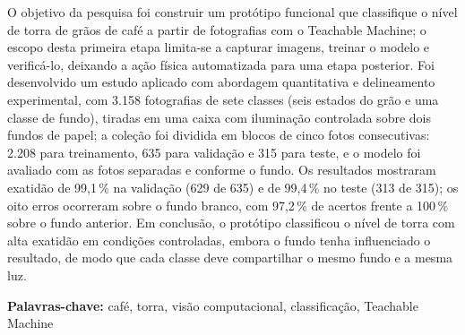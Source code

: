 \begin{absblock}
O objetivo da pesquisa foi construir um protótipo funcional que classifique o nível de torra de grãos de café a partir de fotografias com o Teachable Machine; o escopo desta primeira etapa limita-se a capturar imagens, treinar o modelo e verificá-lo, deixando a ação física automatizada para uma etapa posterior. Foi desenvolvido um estudo aplicado com abordagem quantitativa e delineamento experimental, com 3.158 fotografias de sete classes (seis estados do grão e uma classe de fundo), tiradas em uma caixa com iluminação controlada sobre dois fundos de papel; a coleção foi dividida em blocos de cinco fotos consecutivas: 2.208 para treinamento, 635 para validação e 315 para teste, e o modelo foi avaliado com as fotos separadas e conforme o fundo. Os resultados mostraram exatidão de 99,1\,\% na validação (629 de 635) e de 99,4\,\% no teste (313 de 315); os oito erros ocorreram sobre o fundo branco, com 97,2\,\% de acertos frente a 100\,\% sobre o fundo anterior. Em conclusão, o protótipo classificou o nível de torra com alta exatidão em condições controladas, embora o fundo tenha influenciado o resultado, de modo que cada classe deve compartilhar o mesmo fundo e a mesma luz.

\textbf{Palavras-chave:} café, torra, visão computacional, classificação, Teachable Machine
\end{absblock}
